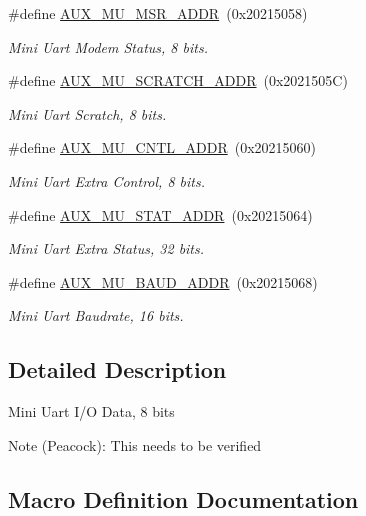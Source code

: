 \begin{DoxyCompactItemize}
\#define \hyperlink{group__UART_gad7e37af940a9ff96e6aba9d307b926be}{A\+U\+X\+\_\+\+M\+U\+\_\+\+M\+S\+R\+\_\+\+A\+D\+DR}~(0x20215058)
\begin{DoxyCompactList}\small\item\em Mini Uart Modem Status, 8 bits. \end{DoxyCompactList}\item 
\#define \hyperlink{group__UART_ga34eb1e827236c566957962b30be74496}{A\+U\+X\+\_\+\+M\+U\+\_\+\+S\+C\+R\+A\+T\+C\+H\+\_\+\+A\+D\+DR}~(0x2021505\+C)
\begin{DoxyCompactList}\small\item\em Mini Uart Scratch, 8 bits. \end{DoxyCompactList}\item 
\#define \hyperlink{group__UART_ga9c3d11375873d03e2bb8b93d3ae970fb}{A\+U\+X\+\_\+\+M\+U\+\_\+\+C\+N\+T\+L\+\_\+\+A\+D\+DR}~(0x20215060)
\begin{DoxyCompactList}\small\item\em Mini Uart Extra Control, 8 bits. \end{DoxyCompactList}\item 
\#define \hyperlink{group__UART_ga3ab600905dcef74e8756dcc8d54c6ef9}{A\+U\+X\+\_\+\+M\+U\+\_\+\+S\+T\+A\+T\+\_\+\+A\+D\+DR}~(0x20215064)
\begin{DoxyCompactList}\small\item\em Mini Uart Extra Status, 32 bits. \end{DoxyCompactList}\item 
\#define \hyperlink{group__UART_ga8430fd87ed60df61a2cf173f54c15549}{A\+U\+X\+\_\+\+M\+U\+\_\+\+B\+A\+U\+D\+\_\+\+A\+D\+DR}~(0x20215068)
\begin{DoxyCompactList}\small\item\em Mini Uart Baudrate, 16 bits. \end{DoxyCompactList}\end{DoxyCompactItemize}


\subsection{Detailed Description}
Mini Uart I/O Data, 8 bits \begin{DoxyNote}{Note}
(Peacock)\+: This needs to be verified 
\end{DoxyNote}


\subsection{Macro Definition Documentation}
\mbox{\label{group__UART_ga8430fd87ed60df61a2cf173f54c15549}} 
